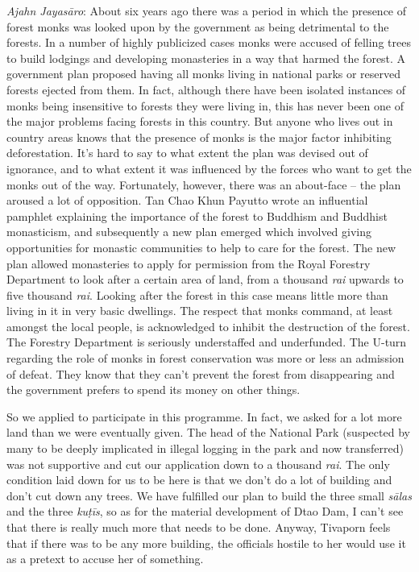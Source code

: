 \emph{Ajahn Jayasāro}: About six years ago there was a period in which
the presence of forest monks was looked upon by the government as being
detrimental to the forests. In a number of highly publicized cases monks
were accused of felling trees to build lodgings and developing
monasteries in a way that harmed the forest. A government plan proposed
having all monks living in national parks or reserved forests ejected
from them. In fact, although there have been isolated instances of monks
being insensitive to forests they were living in, this has never been
one of the major problems facing forests in this country. But anyone who
lives out in country areas knows that the presence of monks is the major
factor inhibiting deforestation. It's hard to say to what extent the
plan was devised out of ignorance, and to what extent it was influenced
by the forces who want to get the monks out of the way. Fortunately, 
however, there was an about-face -- the plan aroused a lot of
opposition. Tan Chao Khun Payutto wrote an influential pamphlet
explaining the importance of the forest to Buddhism and Buddhist
monasticism, and subsequently a new plan emerged which involved giving
opportunities for monastic communities to help to care for the forest. 
The new plan allowed monasteries to apply for permission from the Royal
Forestry Department to look after a certain area of land, from a
thousand \emph{rai} upwards to five thousand \emph{rai}. Looking after
the forest in this case means little more than living in it in very
basic dwellings. The respect that monks command, at least amongst the
local people, is acknowledged to inhibit the destruction of the forest. 
The Forestry Department is seriously understaffed and underfunded. The
U-turn regarding the role of monks in forest conservation was more or
less an admission of defeat. They know that they can't prevent the
forest from disappearing and the government prefers to spend its money
on other things. 

So we applied to participate in this programme. In fact, we asked for a
lot more land than we were eventually given. The head of the National
Park (suspected by many to be deeply implicated in illegal logging in
the park and now transferred) was not supportive and cut our application
down to a thousand \emph{rai}. The only condition laid down for us to be
here is that we don't do a lot of building and don't cut down any trees. 
We have fulfilled our plan to build the three small \emph{sālas} and the
three \emph{kuṭīs}, so as for the material development of Dtao Dam, I
can't see that there is really much more that needs to be done. Anyway, 
Tivaporn feels that if there was to be any more building, the officials
hostile to her would use it as a pretext to accuse her of something. 

